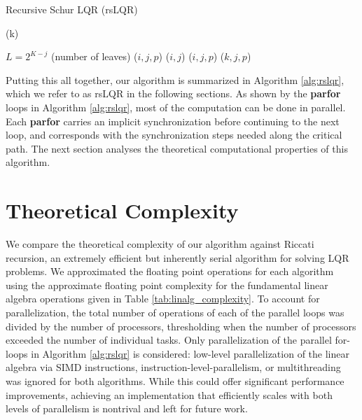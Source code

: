 \documentclass[../root.tex]{subfiles}
\newcommand{\0}{{\transparent{0} \resizebox{\mycellheight}{\mycellheight}{0}}}
\begin{document}
\begin{algorithm}
    \caption{Recursive Schur LQR (rsLQR)}
    \begin{algorithmic}[1]
            \State {}(k)
        \EndParFor

        \For {$j \in (0,D]$}
            \State $L = 2^{K-j}$ (number of leaves)
            \ParFor {$i \in (0,L], p \in [j,K+1]$}
                \State {}($i, j, p$)
            \EndParFor
            \ParFor {$i \in (0,L]$}
                \State {}($i, j$)
            \EndParFor
            \ParFor {$i \in (0,L], p \in (j,K+1]$}
                \State {}($i, j, p$)
            \EndParFor
            \ParFor {$k \in (0,N], p \in (j,K+1]$}
                \State {}($k,j,p$)
            \EndParFor
        \EndFor
    \end{algorithmic} 
    \label{alg:rslqr}
\end{algorithm}
Putting this all together, our algorithm is summarized in Algorithm \ref{alg:rslqr}, which 
we refer to as rsLQR in the following sections.
As shown by the \textbf{parfor} loops in Algorithm \ref{alg:rslqr}, most of the computation
can be done in parallel. Each \textbf{parfor} carries an implicit synchronization before
continuing to the next loop, and corresponds with the synchronization steps needed along the
critical path. The next section analyses the theoretical computational properties of this
algorithm. 


\section{Theoretical Complexity} \label{sec:results_theory}
We compare the theoretical complexity of our algorithm against Riccati recursion, an 
extremely efficient but inherently serial algorithm for solving LQR problems.
We approximated the 
floating point operations for each algorithm using the approximate floating point 
complexity 
for the fundamental linear algebra operations given in Table \ref{tab:linalg_complexity}. 
To account for 
parallelization, the total number of operations of each of the parallel loops was divided by 
the number of
processors, thresholding when the number of processors exceeded the number of individual 
tasks. Only parallelization of the parallel for-loops in Algorithm \ref{alg:rslqr}
is considered: low-level parallelization of the linear algebra
via SIMD instructions, instruction-level-parallelism, or multithreading was ignored for 
both algorithms. While this could offer significant performance improvements, achieving an 
implementation that efficiently scales with both levels of parallelism is nontrival and 
left for future work.
\end{document}

